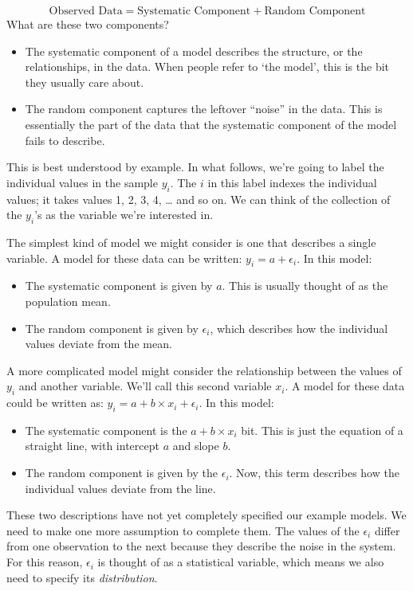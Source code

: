\documentclass[
]{book}
\begin{document}
\[\text{Observed Data} = \text{Systematic Component} + \text{Random Component}\] What are these two components?

\begin{itemize}
\item
  The systematic component of a model describes the structure, or the relationships, in the data. When people refer to `the model', this is the bit they usually care about.
\item
  The random component captures the leftover ``noise'' in the data. This is essentially the part of the data that the systematic component of the model fails to describe.
\end{itemize}

This is best understood by example. In what follows, we're going to label the individual values in the sample \(y_i\). The \(i\) in this label indexes the individual values; it takes values 1, 2, 3, 4, \ldots{} and so on. We can think of the collection of the \(y_i\)'s as the variable we're interested in.

The simplest kind of model we might consider is one that describes a single variable. A model for these data can be written: \(y_i = a + \epsilon_i\). In this model:

\begin{itemize}
\item
  The systematic component is given by \(a\). This is usually thought of as the population mean.
\item
  The random component is given by \(\epsilon_i\), which describes how the individual values deviate from the mean.
\end{itemize}

A more complicated model might consider the relationship between the values of \(y_i\) and another variable. We'll call this second variable \(x_i\). A model for these data could be written as: \(y_i = a + b \times x_i + \epsilon_i\). In this model:

\begin{itemize}
\item
  The systematic component is the \(a + b \times x_i\) bit. This is just the equation of a straight line, with intercept \(a\) and slope \(b\).
\item
  The random component is given by the \(\epsilon_i\). Now, this term describes how the individual values deviate from the line.
\end{itemize}

These two descriptions have not yet completely specified our example models. We need to make one more assumption to complete them. The values of the \(\epsilon_i\) differ from one observation to the next because they describe the noise in the system. For this reason, \(\epsilon_i\) is thought of as a statistical variable, which means we also need to specify its \emph{distribution}.
\end{document}

